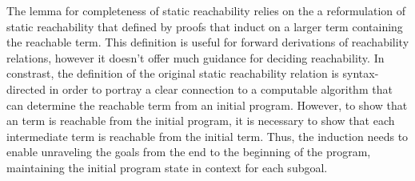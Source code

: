 \documentclass[10pt]{article}
\begin{document}
The lemma for completeness of static reachability relies on the a reformulation of
static reachability that defined by proofs that induct on a larger term
containing the reachable term.  This definition is useful for forward derivations
of reachability relations, however it doesn't offer much guidance for deciding reachability. 
In constrast, the definition of the original static reachability relation is
syntax-directed in order to portray a clear connection to
a computable algorithm that can determine the reachable term from an initial program.
However, to show that an term is reachable from the initial program, it is necessary to
show that each intermediate term is reachable from the initial term.  Thus, the
induction needs to enable unraveling the goals from the end to the beginning of the program,
maintaining the initial program state in context for each subgoal.
\end{document}

